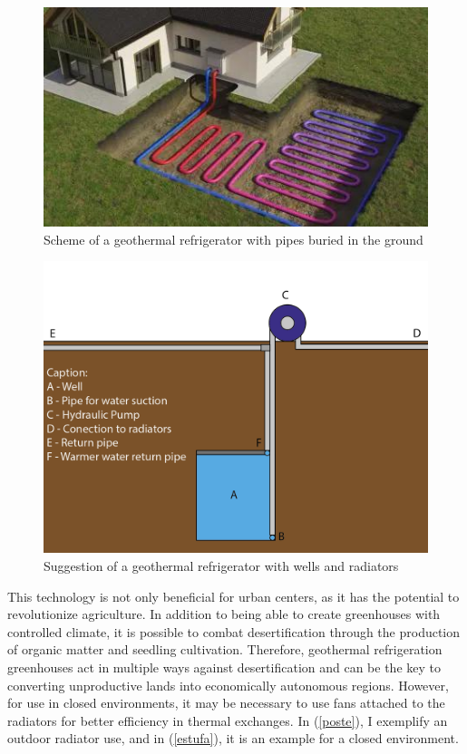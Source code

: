 \begin{figure}[ht]
    \centering
    \includegraphics[scale=0.7]{pictures/geoterma-padrao.jpeg}
    \caption{Scheme of a geothermal refrigerator with pipes buried in the ground}
    \label{geothermal-default}
\end{figure}

\begin{figure}[ht]
    \centering
    \includegraphics[scale=0.6]{pictures/geoterma.png}
    \caption{Suggestion of a geothermal refrigerator with wells and radiators}
    \label{geothermal-new}
\end{figure}

This technology is not only beneficial for urban centers, as it has the potential to revolutionize agriculture. In addition to being able to create greenhouses with controlled climate, it is possible to combat desertification through the production of organic matter and seedling cultivation. Therefore, geothermal refrigeration greenhouses act in multiple ways against desertification and can be the key to converting unproductive lands into economically autonomous regions. However, for use in closed environments, it may be necessary to use fans attached to the radiators for better efficiency in thermal exchanges. In (\autoref{poste}), I exemplify an outdoor radiator use, and in (\autoref{estufa}), it is an example for a closed environment.

